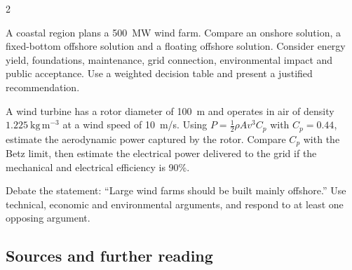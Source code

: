 \begin{multicols}{2}
\begin{challenge}
A coastal region plans a 500~MW wind farm. Compare an onshore solution, a fixed-bottom
offshore solution and a floating offshore solution. Consider energy yield, foundations,
maintenance, grid connection, environmental impact and public acceptance. Use a weighted
decision table and present a justified recommendation.
\end{challenge}

\begin{applicationexercise}
A wind turbine has a rotor diameter of 100~m and operates in air of density
$1.225~\mathrm{kg\,m^{-3}}$ at a wind speed of 10~m/s. Using
$P=\tfrac12\rho A v^3 C_p$ with $C_p=0.44$, estimate the aerodynamic power captured by the
rotor. Compare $C_p$ with the Betz limit, then estimate the electrical power delivered to the
grid if the mechanical and electrical efficiency is 90\%.
\end{applicationexercise}

\begin{speaking}
Debate the statement: ``Large wind farms should be built mainly offshore.'' Use technical,
economic and environmental arguments, and respond to at least one opposing argument.
\end{speaking}

\end{multicols}

\subsection*{Sources and further reading}
\quad
{}
